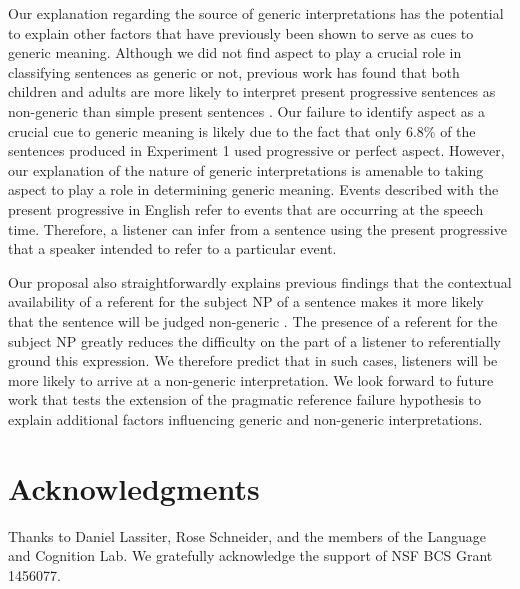 \documentclass[10pt,letterpaper]{article}
\begin{document}
Our explanation regarding the source of generic interpretations has the potential to explain other factors that have previously been shown to serve as cues to generic meaning. Although we did not find aspect to play a crucial role in classifying sentences as generic or not, previous work has found that both children and adults are more likely to interpret present progressive sentences as non-generic than simple present sentences \cite{Cimpian:2011}. Our failure to identify aspect as a crucial cue to generic meaning is likely due to the fact that only 6.8\% of the sentences produced in Experiment 1 used progressive or perfect aspect. However, our explanation of the nature of generic interpretations is amenable to taking aspect to play a role in determining generic meaning. Events described with the present progressive in English refer to events that are occurring at the speech time. Therefore, a listener can infer from a sentence using the present progressive that a speaker intended to refer to a particular event.

Our proposal also straightforwardly explains previous findings that the contextual availability of a referent for the subject NP of a sentence makes it more likely that the sentence will be judged non-generic \cite{Gelman:2003}. The presence of a referent for the subject NP greatly reduces the difficulty on the part of a listener to referentially ground this expression. We therefore predict that in such cases, listeners will be more likely to arrive at a non-generic interpretation. We look forward to future work that tests the extension of the pragmatic reference failure hypothesis to explain additional factors influencing generic and non-generic interpretations.

\section{Acknowledgments}

Thanks to Daniel Lassiter, Rose Schneider, and the members of the Language and Cognition Lab. We gratefully acknowledge the support of NSF BCS Grant 1456077.



\setlength{\bibleftmargin}{.125in}
\setlength{\bibindent}{-\bibleftmargin}


\end{document}
